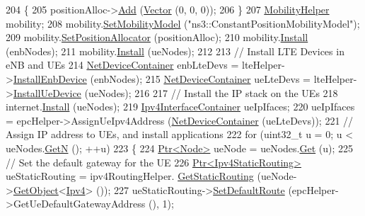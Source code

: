 \begin{DoxyCode}
204     \{
205       positionAlloc->\hyperlink{classns3_1_1ListPositionAllocator_a460e82f015ac012a73ba0ea0cccb3486}{Add} (\hyperlink{classns3_1_1Vector3D_a7e59b47bc94c9cb1dadff68c1d0112d8}{Vector} (0, 0, 0));
206     \}
207   \hyperlink{classns3_1_1MobilityHelper}{MobilityHelper} mobility;
208   mobility.\hyperlink{classns3_1_1MobilityHelper_a030275011b6f40682e70534d30280aba}{SetMobilityModel} (\textcolor{stringliteral}{"ns3::ConstantPositionMobilityModel"});
209   mobility.\hyperlink{classns3_1_1MobilityHelper_ac59d5295076be3cc11021566713a28c5}{SetPositionAllocator} (positionAlloc);
210   mobility.\hyperlink{classns3_1_1MobilityHelper_a07737960ee95c0777109cf2994dd97ae}{Install} (enbNodes);
211   mobility.\hyperlink{classns3_1_1MobilityHelper_a07737960ee95c0777109cf2994dd97ae}{Install} (ueNodes);
212 
213   \textcolor{comment}{// Install LTE Devices in eNB and UEs}
214   \hyperlink{classns3_1_1NetDeviceContainer}{NetDeviceContainer} enbLteDevs = lteHelper->\hyperlink{classns3_1_1LteHelper_a5e009ad35ef85f46b5a6099263f15a03}{InstallEnbDevice} (enbNodes);
215   \hyperlink{classns3_1_1NetDeviceContainer}{NetDeviceContainer} ueLteDevs = lteHelper->\hyperlink{classns3_1_1LteHelper_ac9cd932d7de92811cfa953c2e3b2fc9f}{InstallUeDevice} (ueNodes);
216 
217   \textcolor{comment}{// Install the IP stack on the UEs}
218   internet.\hyperlink{classns3_1_1InternetStackHelper_a6645b412f31283d2d9bc3d8a95cebbc0}{Install} (ueNodes);
219   \hyperlink{classns3_1_1Ipv4InterfaceContainer}{Ipv4InterfaceContainer} ueIpIfaces;
220   ueIpIfaces = epcHelper->AssignUeIpv4Address (\hyperlink{classns3_1_1NetDeviceContainer}{NetDeviceContainer} (ueLteDevs));
221   \textcolor{comment}{// Assign IP address to UEs, and install applications}
222   \textcolor{keywordflow}{for} (uint32\_t u = 0; u < ueNodes.\hyperlink{classns3_1_1NodeContainer_aed647ac56d0407a7706aba02eb44b951}{GetN} (); ++u)
223     \{
224       \hyperlink{classns3_1_1Ptr}{Ptr<Node>} ueNode = ueNodes.\hyperlink{classns3_1_1NodeContainer_a9ed96e2ecc22e0f5a3d4842eb9bf90bf}{Get} (u);
225       \textcolor{comment}{// Set the default gateway for the UE}
226       \hyperlink{classns3_1_1Ptr}{Ptr<Ipv4StaticRouting>} ueStaticRouting = ipv4RoutingHelper.
      \hyperlink{classns3_1_1Ipv4StaticRoutingHelper_a731206e50d305695dac7fb2ef963a4bb}{GetStaticRouting} (ueNode->\hyperlink{classns3_1_1Object_a13e18c00017096c8381eb651d5bd0783}{GetObject}<\hyperlink{classns3_1_1Ipv4}{Ipv4}> ());
227       ueStaticRouting->\hyperlink{classns3_1_1Ipv4StaticRouting_aee30fa3246c2b42f122dabdff2725331}{SetDefaultRoute} (epcHelper->GetUeDefaultGatewayAddress (), 1);

\end{DoxyCode}
